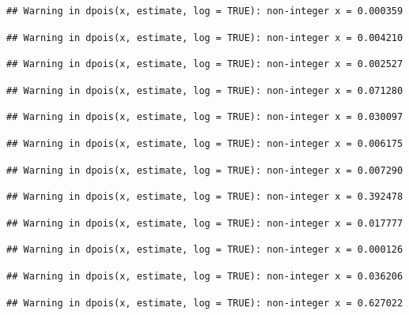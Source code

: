 \documentclass[]{article}
\begin{document}
\begin{verbatim}
## Warning in dpois(x, estimate, log = TRUE): non-integer x = 0.000359
\end{verbatim}

\begin{verbatim}
## Warning in dpois(x, estimate, log = TRUE): non-integer x = 0.004210
\end{verbatim}

\begin{verbatim}
## Warning in dpois(x, estimate, log = TRUE): non-integer x = 0.002527
\end{verbatim}

\begin{verbatim}
## Warning in dpois(x, estimate, log = TRUE): non-integer x = 0.071280
\end{verbatim}

\begin{verbatim}
## Warning in dpois(x, estimate, log = TRUE): non-integer x = 0.030097
\end{verbatim}

\begin{verbatim}
## Warning in dpois(x, estimate, log = TRUE): non-integer x = 0.006175
\end{verbatim}

\begin{verbatim}
## Warning in dpois(x, estimate, log = TRUE): non-integer x = 0.007290
\end{verbatim}

\begin{verbatim}
## Warning in dpois(x, estimate, log = TRUE): non-integer x = 0.392478
\end{verbatim}

\begin{verbatim}
## Warning in dpois(x, estimate, log = TRUE): non-integer x = 0.017777
\end{verbatim}

\begin{verbatim}
## Warning in dpois(x, estimate, log = TRUE): non-integer x = 0.000126
\end{verbatim}

\begin{verbatim}
## Warning in dpois(x, estimate, log = TRUE): non-integer x = 0.036206
\end{verbatim}

\begin{verbatim}
## Warning in dpois(x, estimate, log = TRUE): non-integer x = 0.627022
\end{verbatim}
\end{document}
